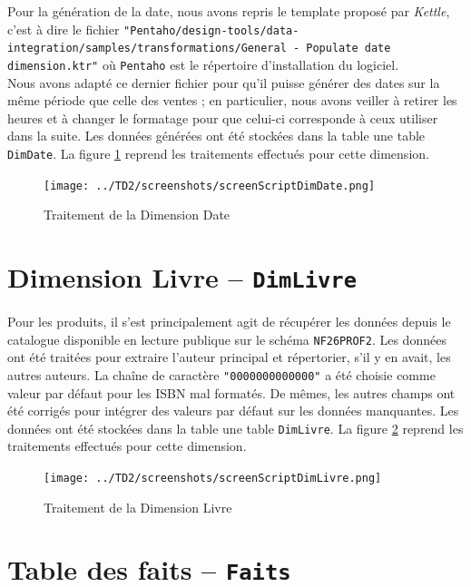 	Pour la génération de la date, nous avons repris le template proposé par \textit{Kettle}, c'est à dire le fichier \texttt{"Pentaho/design-tools/data-integration/samples/transformations/General - Populate date dimension.ktr"} où \texttt{Pentaho} est le répertoire d'installation du logiciel.\\
	
	Nous avons adapté ce dernier fichier pour qu'il puisse générer des dates sur la même période que celle des ventes ; en particulier, nous avons veiller à retirer les heures et à changer le formatage pour que celui-ci corresponde à ceux utiliser dans la suite. Les données générées ont été stockées dans la table une table \texttt{DimDate}. La figure \ref{date} reprend les traitements effectués pour cette dimension.


	\begin{figure}[H]
      \centerline{\texttt{[image: ../TD2/screenshots/screenScriptDimDate.png]}}
      \caption{Traitement de la Dimension Date}
      \label{date}
  	\end{figure}
  	

\section{Dimension Livre -- \texttt{DimLivre}}

	Pour les produits, il s'est principalement agit de récupérer les données depuis le catalogue disponible en lecture publique sur le schéma \texttt{NF26PROF2}. Les données ont été traitées pour extraire l'auteur principal et répertorier, s'il y en avait, les autres auteurs. La chaîne de caractère \texttt{"0000000000000"} a été choisie comme valeur par défaut pour les ISBN mal formatés. De mêmes, les autres champs ont été corrigés pour intégrer des valeurs par défaut sur les données manquantes. Les données ont été stockées dans la table une table \texttt{DimLivre}. La figure \ref{livre} reprend les traitements effectués pour cette dimension.


	\begin{figure}[H]
      \centerline{\texttt{[image: ../TD2/screenshots/screenScriptDimLivre.png]}}
      \caption{Traitement de la Dimension Livre}
      \label{livre}
  	\end{figure}
  	


\section{Table des faits -- \texttt{Faits}}
	
